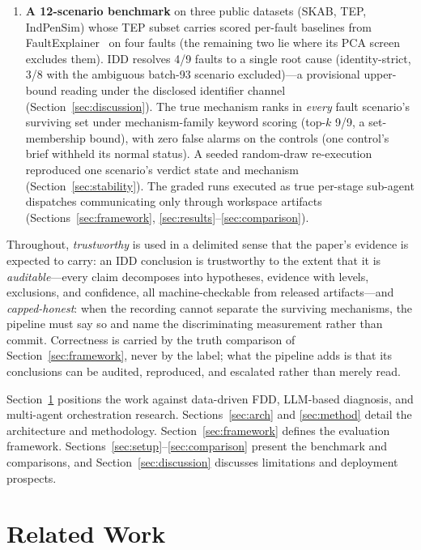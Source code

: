 \documentclass[preprint,10pt]{elsarticle}
\begin{document}
\begin{enumerate}
\item \textbf{A 12-scenario benchmark} on three public datasets (SKAB, TEP, IndPenSim) whose TEP subset carries scored per-fault baselines from FaultExplainer~\cite{khan2024faultexplainer} on four faults (the remaining two lie where its PCA screen excludes them). IDD resolves 4/9 faults to a single root cause (identity-strict, 3/8 with the ambiguous batch-93 scenario excluded)---a provisional upper-bound reading under the disclosed identifier channel (Section~\ref{sec:discussion}). The true mechanism ranks in \emph{every} fault scenario's surviving set under mechanism-family keyword scoring (top-$k$ 9/9, a set-membership bound), with zero false alarms on the controls (one control's brief withheld its normal status). A seeded random-draw re-execution reproduced one scenario's verdict state and mechanism (Section~\ref{sec:stability}). The graded runs executed as true per-stage sub-agent dispatches communicating only through workspace artifacts (Sections~\ref{sec:framework}, \ref{sec:results}--\ref{sec:comparison}).
\end{enumerate}

Throughout, \emph{trustworthy} is used in a delimited sense that the paper's evidence is expected to carry: an IDD conclusion is trustworthy to the extent that it is \emph{auditable}---every claim decomposes into hypotheses, evidence with levels, exclusions, and confidence, all machine-checkable from released artifacts---and \emph{capped-honest}: when the recording cannot separate the surviving mechanisms, the pipeline must say so and name the discriminating measurement rather than commit. Correctness is carried by the truth comparison of Section~\ref{sec:framework}, never by the label; what the pipeline adds is that its conclusions can be audited, reproduced, and escalated rather than merely read.

Section~\ref{sec:related} positions the work against data-driven FDD, LLM-based diagnosis, and multi-agent orchestration research. Sections~\ref{sec:arch} and \ref{sec:method} detail the architecture and methodology. Section~\ref{sec:framework} defines the evaluation framework. Sections~\ref{sec:setup}--\ref{sec:comparison} present the benchmark and comparisons, and Section~\ref{sec:discussion} discusses limitations and deployment prospects.

\section{Related Work}
\label{sec:related}
\end{document}
